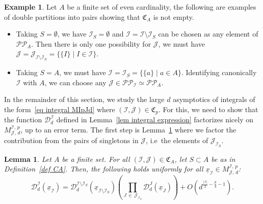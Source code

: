 \documentclass[10pt]{amsart}
\newtheorem{lemm}[theo]{Lemma}\newtheorem{prop}[theo]{Proposition}\newtheorem{coro}[theo]{Corollary}\newtheorem{conj}[theo]{Conjecture}
\theoremstyle{definition}\newtheorem{defi}[theo]{Definition}\newtheorem{rema}[theo]{Remark}\newtheorem{exam}[theo]{Example}\newtheorem{exem}[theo]{Example}\newtheorem{nota}[theo]{Notation}
\newcommand{\D}{\mathcal{D}}
\newcommand{\I}{\mathcal{I}}
\newcommand{\J}{\mathcal{J}}
\newcommand{\frkC}{\mathfrak{C}}
\newcommand{\pp}{\mathcal{P\!P}\!}
\newcommand{\norm}[1]{\left\lvert #1 \right\rvert}
\begin{document}
\begin{exam}\label{ex CA}
Let $A$ be a finite set of even cardinality, the following are examples of double partitions into pairs showing that $\frkC_A$ is not empty.
\begin{itemize}
\item Taking $S = \emptyset$, we have $\I_S = \emptyset$ and $\I = \I \setminus \I_S$ can be chosen as any element of $\pp_A$. Then there is only one possibility for $\J$, we must have $\J = \J_{\I \setminus \I_S} = \{\{I\} \mid I \in \I\}$.
\item Taking $S = A$, we must have $\I = \I_S = \{\{a\} \mid a \in A\}$. Identifying canonically $\I$ with $A$, we can choose any $\J \in \pp_\I \simeq \pp_A$.
\end{itemize}
\end{exam}

In the remainder of this section, we study the large $d$ asymptotics of integrals of the form~\eqref{eq integral MIpJd} where $(\I,\J) \in \frkC_p$. For this, we need to show that the function $\D_d^\I$ defined in Lemma~\ref{lem integral expression} factorizes nicely on $M^{\I,\,p}_{\J,\,d}$, up to an error term. The first step is Lemma~\ref{lem partitions into pairs} where we factor the contribution from the pairs of singletons in $\J$, i.e~the elements of $\J_{\I_S}$.

\begin{lemm}\label{lem partitions into pairs}
Let $A$ be a finite set. For all $(\I,\J) \in \frkC_A$, let $S \subset A$ be as in Definition~\ref{def CA}. Then, the following holds uniformly for all $\underline{x}_\I \in M^{\I,\,p}_{\J,\,d}$:
\[
\D_d^\I\left(\underline{x}_\I\right) = \D_d^{\I \setminus \I_S}\left(\underline{x}_{\I \setminus \I_S}\right) \left(\prod_{J \,\in\,\J_{\I_S}}\D_d^J\left(\underline{x}_J\right)\right) +O\left(d^{\frac{\norm{\I}}{2}-\frac{p}{4}-1}\right).
\]
\end{lemm}
\end{document}
